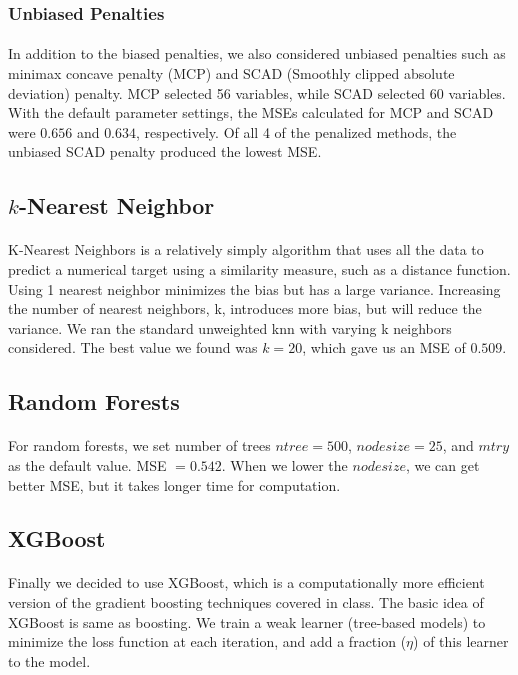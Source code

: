 \documentclass[paper=a4, fontsize=11pt]{scrartcl} %
\numberwithin{equation}{section} %
\numberwithin{figure}{section} %
\numberwithin{table}{section} %
\begin{document}
\subsubsection{Unbiased Penalties}
\paragraph{}
In addition to the biased penalties, we also considered unbiased penalties such as minimax concave penalty (MCP) and SCAD (Smoothly clipped absolute deviation) penalty. MCP selected 56 variables, while SCAD selected 60 variables. With the default parameter settings, the
MSEs calculated for MCP and SCAD were \(0.656\) and \(0.634\), respectively. Of all 4 of the penalized methods, the unbiased SCAD penalty produced the lowest MSE.


\subsection{\(k\)-Nearest Neighbor}
\paragraph{}
 K-Nearest Neighbors is a relatively simply algorithm that uses all the data to predict a numerical target using a similarity measure, such as a distance function. Using 1 nearest neighbor minimizes the bias but has a large variance. Increasing the number of nearest neighbors, k, introduces more bias, but will reduce the variance. 
We ran the standard unweighted knn with varying k neighbors considered. The best value we found was \(k=20\), which gave us an MSE of \(0.509\).


\subsection{Random Forests}
\paragraph{}
For random forests, we set number of trees \(ntree = 500\), \(nodesize = 25\), and \(mtry\) as the default value. MSE \(= 0.542\). When we lower the \(nodesize\), we can get better MSE, but it takes longer time for computation.

\subsection{XGBoost}
\paragraph{}
Finally we decided to use XGBoost, which is a computationally more efficient version of the gradient boosting techniques covered in class. The basic idea of XGBoost is same as boosting. We train a weak learner (tree-based models) to minimize the loss function at each iteration, and add a fraction (\(\eta\)) of this learner to the model.
\end{document}
